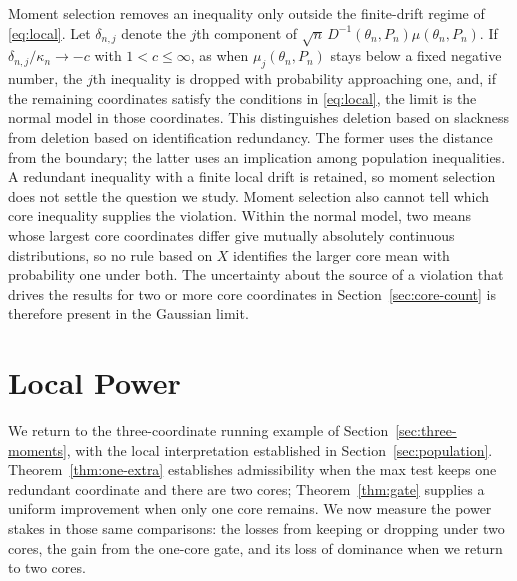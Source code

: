 \documentclass[11pt]{article}
\numberwithin{equation}{section}
\theoremstyle{definition}
\begin{document}
Moment selection removes an inequality only outside the finite-drift regime of \eqref{eq:local}. Let $\delta_{n,j}$ denote the $j$th component of $\sqrt n\,D^{-1}(\theta_n,P_n)\mu(\theta_n,P_n)$. If $\delta_{n,j}/\kappa_n\to-c$ with $1<c\le\infty$, as when $\mu_j(\theta_n,P_n)$ stays below a fixed negative number, the $j$th inequality is dropped with probability approaching one, and, if the remaining coordinates satisfy the conditions in \eqref{eq:local}, the limit is the normal model in those coordinates. This distinguishes deletion based on slackness from deletion based on identification redundancy. The former uses the distance from the boundary; the latter uses an implication among population inequalities. A redundant inequality with a finite local drift is retained, so moment selection does not settle the question we study. Moment selection also cannot tell which core inequality supplies the violation. Within the normal model, two means whose largest core coordinates differ give mutually absolutely continuous distributions, so no rule based on $X$ identifies the larger core mean with probability one under both. The uncertainty about the source of a violation that drives the results for two or more core coordinates in Section~\ref{sec:core-count} is therefore present in the Gaussian limit.

\section{Local Power}\label{sec:power}


We return to the three-coordinate running example of Section~\ref{sec:three-moments}, with the local interpretation established in Section~\ref{sec:population}. Theorem~\ref{thm:one-extra} establishes admissibility when the max test keeps one redundant coordinate and there are two cores; Theorem~\ref{thm:gate} supplies a uniform improvement when only one core remains. We now measure the power stakes in those same comparisons: the losses from keeping or dropping under two cores, the gain from the one-core gate, and its loss of dominance when we return to two cores.
\end{document}
